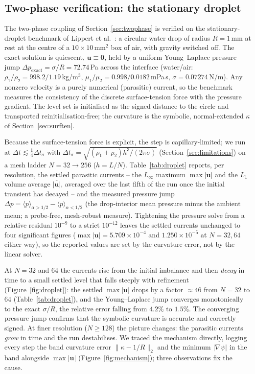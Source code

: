 \documentclass[preprint,3p,11pt]{elsarticle}
\newcommand{\psilev}{\psi}                       %
\newcommand{\uvec}{\mathbf{u}}
\begin{document}
\subsection{Two-phase verification: the stationary droplet}
\label{sec:droplet}
The two-phase coupling of Section~\ref{sec:twophase} is verified on the stationary-droplet
benchmark of Lippert et al.~\cite{lippert2022benchmark}: a circular water drop of radius
$R=1$\,mm at rest at the centre of a $10\times10$\,mm$^2$ box of air, with gravity switched
off. The exact solution is quiescent, $\uvec\equiv\mathbf 0$, held by a uniform
Young--Laplace pressure jump $\Delta p_{\mathrm{exact}}=\sigma/R=72.74$\,Pa across the
interface (water/air: $\rho_1/\rho_2=998.2/1.19$\,kg/m$^3$,
$\mu_1/\mu_2=0.998/0.0182$\,mPa\,s, $\sigma=0.07274$\,N/m). Any nonzero velocity is a purely
numerical (parasitic) current, so the benchmark measures the consistency of the discrete
surface-tension force with the pressure gradient. The level set is initialised as the signed
distance to the circle and transported reinitialisation-free; the curvature is the symbolic,
normal-extended $\kappa$ of Section~\ref{sec:surften}.

Because the surface-tension force is explicit, the step is capillary-limited; we run at
$\Delta t\lesssim\tfrac14\Delta t_\sigma$ with $\Delta t_\sigma=\sqrt{(\rho_1+\rho_2)h^3/
(2\pi\sigma)}$ (Section~\ref{sec:limitations}) on a mesh ladder $N=32\to256$ ($h=L/N$).
Table~\ref{tab:droplet} reports, per resolution, the settled parasitic currents -- the
$L_\infty$ maximum $\max|\uvec|$ and the $L_1$ volume average $\overline{|\uvec|}$, averaged
over the last fifth of the run once the initial transient has decayed -- and the measured
pressure jump $\Delta p=\langle p\rangle_{\alpha>1/2}-\langle p\rangle_{\alpha<1/2}$ (the
drop-interior mean pressure minus the ambient mean; a probe-free, mesh-robust measure). Tightening
the pressure solve from a relative residual $10^{-9}$ to a strict $10^{-12}$ leaves the settled
currents unchanged to four significant figures ($\max|\uvec|=5.709\times10^{-4}$ and
$1.250\times10^{-5}$ at $N=32,64$ either way), so the reported values are set by the curvature error,
not by the linear solver.

At $N=32$ and $64$ the currents rise from the initial imbalance and then \emph{decay} in
time to a small settled level that falls steeply with refinement (Figure~\ref{fig:droplet}):
the settled $\max|\uvec|$ drops by a factor $\approx\!46$ from $N=32$ to $64$
(Table~\ref{tab:droplet}), and the Young--Laplace jump converges monotonically to the exact
$\sigma/R$, the relative error falling from $4.2\%$ to $1.5\%$. The converging pressure jump
confirms that the symbolic curvature is accurate and correctly signed. At finer resolution
($N\!\ge\!128$) the picture changes: the parasitic currents \emph{grow} in time and the run
destabilises. We traced the mechanism directly, logging every step the band curvature error
$\|\kappa-1/R\|_2$ and the minimum $\lvert\nabla\psilev\rvert$ in the band alongside
$\max\lvert\uvec\rvert$ (Figure~\ref{fig:mechanism}); three observations fix the cause.
\end{document}
